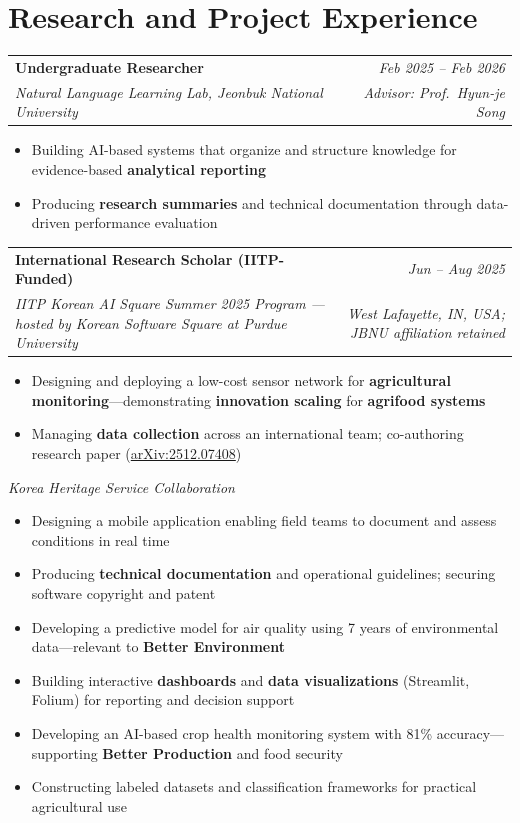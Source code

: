 \documentclass[a4paper,11pt]{article}
\makeatletter
\newcommand{\entryhead}[4]{%
  \vspace{6pt}%
  \begin{tabular*}{\textwidth}{@{}l@{\extracolsep{\fill}}r@{}}
    \textbf{#1} & {\small\textit{#2}}\\
    {\small\textit{#3}} & {\small\textit{#4}}\\
  \end{tabular*}\vspace{2pt}%
}
\newcommand{\bulletstart}{\begin{itemize}[leftmargin=0.20in, topsep=2pt, itemsep=2.5pt, parsep=0pt]}
\newcommand{\bulletend}{\end{itemize}}
\newcommand{\bitem}[1]{\item\small{#1}}
\makeatother
\begin{document}
\section{Research and Project Experience}

\entryhead
  {Undergraduate Researcher}{Feb 2025 -- Feb 2026}
  {Natural Language Learning Lab, Jeonbuk National University}{Advisor: Prof.\ Hyun-je Song}
\bulletstart
  \bitem{Building AI-based systems that organize and structure knowledge for evidence-based \textbf{analytical reporting}}
  \bitem{Producing \textbf{research summaries} and technical documentation through data-driven performance evaluation}
\bulletend

\entryhead
  {International Research Scholar (IITP-Funded)}{Jun -- Aug 2025}
  {IITP Korean AI Square Summer 2025 Program --- hosted by Korean Software Square at Purdue University}{West Lafayette, IN, USA; JBNU affiliation retained}
\bulletstart
  \bitem{Designing and deploying a low-cost sensor network for \textbf{agricultural monitoring}---demonstrating \textbf{innovation scaling} for \textbf{agrifood systems}}
  \bitem{Managing \textbf{data collection} across an international team; co-authoring research paper (\href{https://arxiv.org/abs/2512.07408}{arXiv:2512.07408})}
\bulletend

{\small\textit{Korea Heritage Service Collaboration}}
\bulletstart
  \bitem{Designing a mobile application enabling field teams to document and assess conditions in real time}
  \bitem{Producing \textbf{technical documentation} and operational guidelines; securing software copyright and patent}
\bulletend

\bulletstart
  \bitem{Developing a predictive model for air quality using 7 years of environmental data---relevant to \textbf{Better Environment}}
  \bitem{Building interactive \textbf{dashboards} and \textbf{data visualizations} (Streamlit, Folium) for reporting and decision support}
\bulletend

\bulletstart
  \bitem{Developing an AI-based crop health monitoring system with 81\% accuracy---supporting \textbf{Better Production} and food security}
  \bitem{Constructing labeled datasets and classification frameworks for practical agricultural use}
\bulletend


\end{document}
